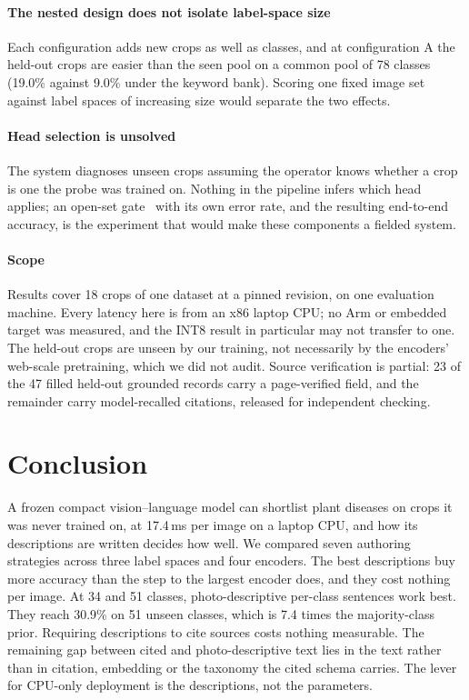 \documentclass[a4paper,fleqn]{cas-dc}
\begin{document}
\paragraph{The nested design does not isolate label-space size} Each configuration adds new crops as
well as classes, and at configuration A the held-out crops are easier than the seen pool on a common
pool of 78 classes (19.0\% against 9.0\% under the keyword bank). Scoring one fixed image set against
label spaces of increasing size would separate the two effects.

\paragraph{Head selection is unsolved} The system diagnoses unseen crops assuming the operator knows
whether a crop is one the probe was trained on. Nothing in the pipeline infers which head applies; an
open-set gate~\citep{scheirer2013openset} with its own error rate, and the resulting end-to-end
accuracy, is the experiment that would make these components a fielded system.

\paragraph{Scope} Results cover 18 crops of one dataset at a pinned revision, on one evaluation
machine. Every latency here is from an x86 laptop CPU; no Arm or embedded target was measured, and
the INT8 result in particular may not transfer to one. The held-out crops are unseen by our
training, not necessarily by the encoders' web-scale pretraining, which we did not audit. Source
verification is partial: 23 of the 47 filled held-out grounded records carry a page-verified field,
and the remainder carry model-recalled citations, released for independent checking.

\FloatBarrier
\section{Conclusion}
\label{sec:conclusion}

A frozen compact vision--language model can shortlist plant diseases on crops it was never trained
on, at 17.4\,ms per image on a laptop CPU, and how its descriptions are written decides how well.
We compared seven authoring strategies across three label spaces and four encoders. The best
descriptions buy more accuracy than the step to the largest encoder does, and they cost nothing per
image. At 34 and 51 classes, photo-descriptive per-class sentences work best. They reach 30.9\% on
51 unseen classes, which is 7.4 times the majority-class prior. Requiring descriptions to cite
sources costs nothing measurable. The
remaining gap between cited and photo-descriptive text lies in the text rather than in citation,
embedding or the taxonomy the cited schema carries. The lever for CPU-only deployment is the descriptions, not the parameters.
\end{document}
